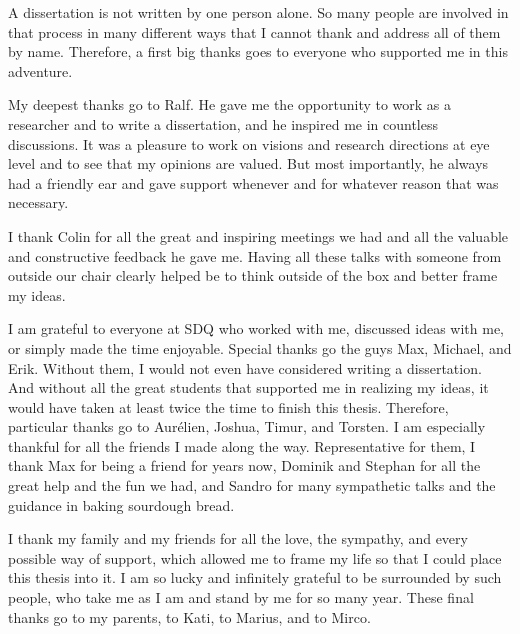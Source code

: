 A dissertation is not written by one person alone.
So many people are involved in that process in many different ways that I cannot thank and address all of them by name.
Therefore, a first big thanks goes to everyone who supported me in this adventure.

My deepest thanks go to Ralf.
He gave me the opportunity to work as a researcher and to write a dissertation, and he inspired me in countless discussions. It was a pleasure to work on visions and research directions at eye level and to see that my opinions are valued.
But most importantly, he always had a friendly ear and gave support whenever and for whatever reason that was necessary. 

I thank Colin for all the great and inspiring meetings we had and all the valuable and constructive feedback he gave me. Having all these talks with someone from outside our chair clearly helped be to think outside of the box and better frame my ideas.

I am grateful to everyone at SDQ who worked with me, discussed ideas with me, or simply made the time enjoyable.
Special thanks go the \vitruvius guys Max, Michael, and Erik. Without them, I would not even have considered writing a dissertation.
And without all the great students that supported me in realizing my ideas, it would have taken at least twice the time to finish this thesis. 
Therefore, particular thanks go to Aurélien, Joshua, Timur, and Torsten.
I am especially thankful for all the friends I made along the way. Representative for them, I thank Max for being a friend for years now, Dominik and Stephan for all the great help and the fun we had, and Sandro for many sympathetic talks and the guidance in baking sourdough bread.

I thank my family and my friends for all the love, the sympathy, and every possible way of support, which allowed me to frame my life so that I could place this thesis into it.
I am so lucky and infinitely grateful to be surrounded by such people, who take me as I am and stand by me for so many year.
These final thanks go to my parents, to Kati, to Marius, and to Mirco.
